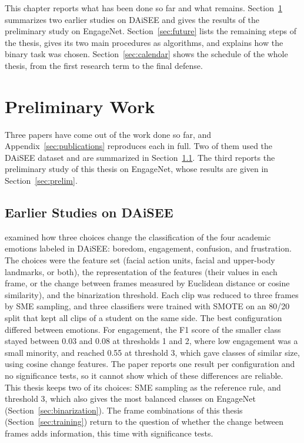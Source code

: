 This chapter reports what has been done so far and what remains. Section~\ref{sec:prelimwork} summarizes two earlier studies on DAiSEE and gives the results of the preliminary study on EngageNet. Section~\ref{sec:future} lists the remaining steps of the thesis, gives its two main procedures as algorithms, and explains how the binary task was chosen. Section~\ref{sec:calendar} shows the schedule of the whole thesis, from the first research term to the final defense.



\section{Preliminary Work}
\label{sec:prelimwork}

Three papers have come out of the work done so far, and Appendix~\ref{sec:publications} reproduces each in full. Two of them used the DAiSEE dataset \cite{gupta2016} and are summarized in Section~\ref{sec:daisee}. The third reports the preliminary study of this thesis on EngageNet, whose results are given in Section~\ref{sec:prelim}.

\subsection{Earlier Studies on DAiSEE}
\label{sec:daisee}

 examined how three choices change the classification of the four academic emotions labeled in DAiSEE: boredom, engagement, confusion, and frustration. The choices were the feature set (facial action units, facial and upper-body landmarks, or both), the representation of the features (their values in each frame, or the change between frames measured by Euclidean distance or cosine similarity), and the binarization threshold. Each clip was reduced to three frames by SME sampling, and three classifiers were trained with SMOTE on an 80/20 split that kept all clips of a student on the same side. The best configuration differed between emotions. For engagement, the F1 score of the smaller class stayed between 0.03 and 0.08 at thresholds 1 and 2, where low engagement was a small minority, and reached 0.55 at threshold 3, which gave classes of similar size, using cosine change features. The paper reports one result per configuration and no significance tests, so it cannot show which of these differences are reliable. This thesis keeps two of its choices: SME sampling as the reference rule, and threshold 3, which also gives the most balanced classes on EngageNet (Section~\ref{sec:binarization}). The frame combinations of this thesis (Section~\ref{sec:training}) return to the question of whether the change between frames adds information, this time with significance tests.

